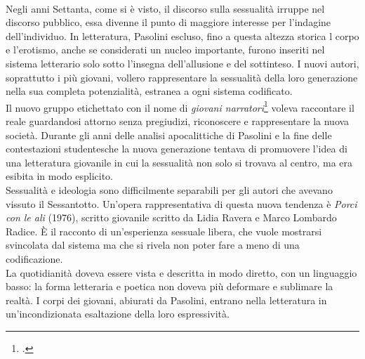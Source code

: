 \paragraph{}Negli anni Settanta, come si è visto, il discorso sulla sessualità irruppe nel discorso pubblico, essa divenne il punto di maggiore interesse per l'indagine dell'individuo.
In letteratura, Pasolini escluso, fino a questa altezza storica l corpo e l'erotismo, anche se considerati un nucleo importante, furono inseriti nel sistema letterario solo sotto l'insegna dell'allusione e del sottinteso.
I nuovi autori, soprattutto i più giovani, vollero rappresentare la sessualità della loro generazione nella sua completa potenzialità, estranea a ogni sistema codificato.
\\Il nuovo gruppo etichettato con il nome di \textit{giovani narratori}\footcite{giovani} voleva raccontare il reale guardandosi attorno senza pregiudizi, riconoscere e rappresentare la nuova società.
Durante gli anni delle analisi apocalittiche di Pasolini e la fine delle contestazioni studentesche la nuova generazione tentava di promuovere l'idea di una letteratura giovanile in cui la sessualità non solo si trovava al centro, ma era esibita in modo esplicito.
\\Sessualità e ideologia sono difficilmente separabili per gli autori che avevano vissuto il Sessantotto.
Un'opera rappresentativa di questa nuova tendenza è \textit{Porci con le ali} (1976), scritto giovanile scritto da Lidia Ravera e Marco Lombardo Radice.
È il racconto di un'esperienza sessuale libera, che vuole mostrarsi svincolata dal sistema ma che si rivela non poter fare a meno di una codificazione.
\\La quotidianità doveva essere vista e descritta in modo diretto, con un linguaggio basso: la forma letteraria e poetica non doveva più deformare e sublimare la realtà.
I corpi dei giovani, abiurati da Pasolini, entrano nella letteratura in un'incondizionata esaltazione della loro espressività.

